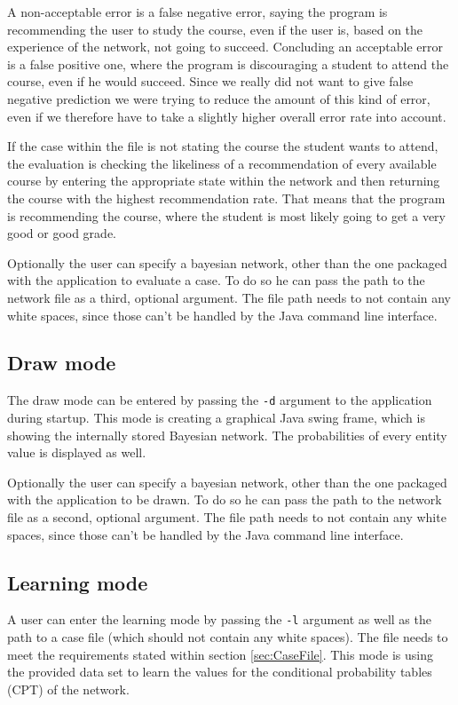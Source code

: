 \documentclass[%
	pdftex,
	oneside,        %
	11pt,           %
	parskip=half,   %
	headsepline,    %
	footsepline,    %
	abstracton,     %
	USenglish,      %
	a4paper,        %
]{report}
\begin{document}
A non-acceptable error is a false negative error, saying the program is recommending the user to study the course, even if the user is, based on the experience of the network, not going to succeed. Concluding an acceptable error is a false positive one, where the program is discouraging a student to attend the course, even if he would succeed. Since we really did not want to give false negative prediction we were trying to reduce the amount of this kind of error, even if we therefore have to take a slightly higher overall error rate into account.

If the case within the file is not stating the course the student wants to attend, the evaluation is checking the likeliness of a recommendation of every available course by entering the appropriate state within the network and then returning the course with the highest recommendation rate. That means that the program is recommending the course, where the student is most likely going to get a very good or good grade.

Optionally the user can specify a bayesian network, other than the one packaged with the application to evaluate a case. To do so he can pass the path to the network file as a third, optional argument. The file path needs to not contain any white spaces, since those can't be handled by the Java command line interface.

\subsection{Draw mode}
The draw mode can be entered by passing the \texttt{-d} argument to the application during startup. This mode is creating a graphical Java swing frame, which is showing the internally stored Bayesian network. The probabilities of every entity value is displayed as well.

Optionally the user can specify a bayesian network, other than the one packaged with the application to be drawn. To do so he can pass the path to the network file as a second, optional argument. The file path needs to not contain any white spaces, since those can't be handled by the Java command line interface.

\subsection{Learning mode}
A user can enter the learning mode by passing the \texttt{-l} argument as well as the path to a case file (which should not contain any white spaces). The file needs to meet the requirements stated within section \vref{sec:CaseFile}. This mode is using the provided data set to learn the values for the conditional probability tables (CPT) of the network.
\end{document}
